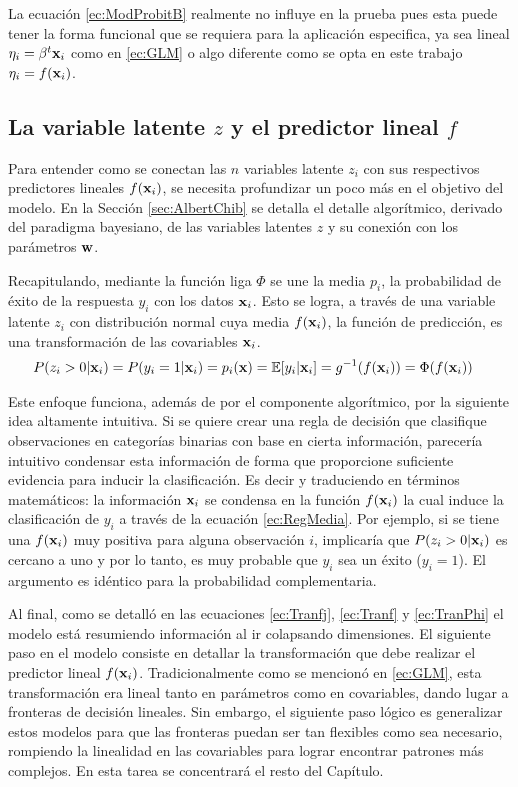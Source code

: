 \documentclass[../Main/Main.tex]{subfiles}
\begin{document}
La ecuación \eqref{ec:ModProbitB} realmente no influye en la prueba pues esta puede tener la forma funcional que se requiera para la aplicación especifica, ya sea lineal $\eta_i = \beta^t\mathbf{x}_i$ como en \eqref{ec:GLM} o algo diferente como se opta en este trabajo $\eta_i = f(\mathbf{x}_i)$.

\subsection{La variable latente $z$ y el predictor lineal $f$} \label{sec:VarLat}
Para entender como se conectan las $n$ variables latente $z_i$ con sus respectivos predictores lineales $f(\mathbf{x}_i)$, se necesita profundizar un poco más en el objetivo del modelo. En la Sección \ref{sec:AlbertChib} se detalla el detalle algorítmico, derivado del paradigma bayesiano, de las variables latentes $z$ y su conexión con los parámetros $\mathbf{w}$. 

Recapitulando, mediante la función liga $\Phi$ se une la media $p_i$, la probabilidad de éxito de la respuesta $y_i$ con los datos $\mathbf{x}_i$. Esto se logra, a través de una variable latente $z_i$ con distribución normal cuya media $f(\mathbf{x}_i)$, la función de predicción, es una transformación de las covariables $\mathbf{x}_i$.
\begin{align} \label{ec:RegMedia}
	P(z_i > 0|\mathbf{x}_i) = P(y_i = 1|\mathbf{x}_i)= p_i(\mathbf{x}) &=\mathbb{E}[y_i|\mathbf{x}_i] = g^{-1}(f(\mathbf{x}_i)) = \Phi(f(\mathbf{x}_i))
\end{align}

Este enfoque funciona, además de por el componente algorítmico, por la siguiente idea altamente intuitiva. Si se quiere crear una regla de decisión que clasifique observaciones en categorías binarias con base en cierta información, parecería intuitivo condensar esta información de  forma que proporcione suficiente evidencia para inducir la clasificación. Es decir y traduciendo en términos matemáticos: la información $\mathbf{x}_i$ se condensa en la función $f(\mathbf{x}_i)$ la cual induce la clasificación de $y_i$ a través de la ecuación \eqref{ec:RegMedia}. Por ejemplo, si se tiene una $f(\mathbf{x}_i)$ muy positiva para alguna observación $i$, implicaría que $P(z_i > 0|\mathbf{x}_i)$ es cercano a uno y por lo tanto, es muy probable que $y_i$ sea un éxito ($y_i = 1$). El argumento es idéntico para la probabilidad complementaria.

Al final, como se detalló en las ecuaciones \eqref{ec:Tranfj}, \eqref{ec:Tranf} y \eqref{ec:TranPhi} el modelo está resumiendo información al ir colapsando dimensiones. El siguiente paso en el modelo consiste en detallar la transformación que debe realizar el predictor lineal $f(\mathbf{x}_i)$. Tradicionalmente como se mencionó en \eqref{ec:GLM}, esta transformación era lineal tanto en parámetros como en covariables, dando lugar a fronteras de decisión lineales. Sin embargo, el siguiente paso lógico es generalizar estos modelos para que las fronteras puedan ser tan flexibles como sea necesario, rompiendo la linealidad en las covariables para lograr encontrar patrones más complejos. En esta tarea se concentrará el resto del Capítulo.
\end{document}

